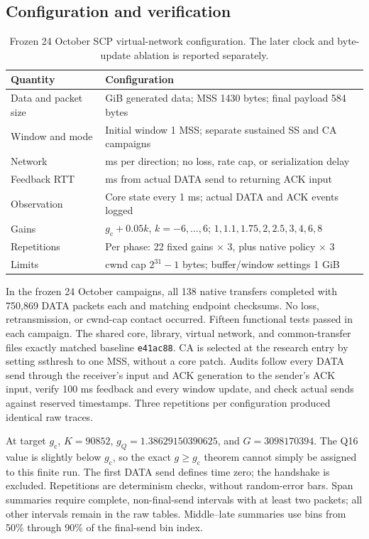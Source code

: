 \documentclass[sigconf,nonacm]{acmart}
\newcommand{\gc}{g_{\mathrm c}}
\begin{document}
\subsection{Configuration and verification}
\begin{table}[t]\small
\caption{Frozen 24 October SCP virtual-network configuration. The later clock and byte-update ablation is reported separately.}\label{tab:setup}
\begin{tabularx}{\columnwidth}{@{}>{\raggedright\arraybackslash}p{}>{\raggedright\arraybackslash}X@{}}\toprule
Quantity & Configuration \\\midrule
Data and packet size & 1 GiB generated data; MSS 1430 bytes; final payload 584 bytes \\
Window and mode & Initial window 1 MSS; separate sustained SS and CA campaigns \\
Network & 50 ms per direction; no loss, rate cap, or serialization delay \\
Feedback RTT & 100 ms from actual DATA send to returning ACK input \\
Observation & Core state every 1 ms; actual DATA and ACK events logged \\
Gains & $\gc+0.05k$, $k=-6,\ldots,6$; $1,1.1,1.75,2,2.5,3,4,6,8$ \\
Repetitions & Per phase: 22 fixed gains $\times$ 3, plus native policy $\times$ 3 \\
Limits & cwnd cap $2^{31}-1$ bytes; buffer/window settings 1 GiB \\\bottomrule
\end{tabularx}\end{table}
In the frozen 24 October campaigns, all 138 native transfers completed with 750,869 DATA packets each and matching endpoint checksums. No loss, retransmission, or cwnd-cap contact occurred. Fifteen functional tests passed in each campaign. The shared core, library, virtual network, and common-transfer files exactly matched baseline \texttt{e41ac88}. CA is selected at the research entry by setting ssthresh to one MSS, without a core patch. Audits follow every DATA send through the receiver's input and ACK generation to the sender's ACK input, verify 100 ms feedback and every window update, and check actual sends against reserved timestamps. Three repetitions per configuration produced identical raw traces.

At target $\gc$, $K=90852$, $g_Q=1.38629150390625$, and $G=3098170394$. The Q16 value is slightly below $\gc$, so the exact $g\ge\gc$ theorem cannot simply be assigned to this finite run. The first DATA send defines time zero; the handshake is excluded. Repetitions are determinism checks, without random-error bars. Span summaries require complete, non-final-send intervals with at least two packets; all other intervals remain in the raw tables. Middle--late summaries use bins from 50\% through 90\% of the final-send bin index.
\end{document}
